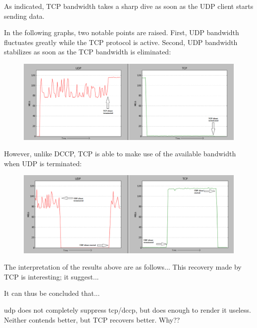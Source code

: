 \documentclass[10pt,a4paper]{article}
\begin{document}
As indicated, TCP bandwidth takes a sharp dive as soon as
the UDP client starts sending data. 

In the following graphs, two notable points are raised. First,
UDP bandwidth fluctuates greatly while the TCP protocol is active.
Second, UDP bandwidth stabilizes as soon as the TCP bandwidth
is eliminated:

\begin{figure}[!h]
\begin{center}
\includegraphics[scale=.4]{screens/re/Screenshot-7.png}
\end{center}
\end{figure}

However, unlike DCCP, TCP is able to make use of the available
bandwidth when UDP is terminated:

\begin{figure}[!h]
\begin{center}
\includegraphics[scale=.4]{screens/re/Screenshot-15.png}
\end{center}
\end{figure}

The interpretation of the results above are as follows...
This recovery made by TCP is interesting; it suggest... %

It can thus be concluded that...

udp does not completely suppress tcp/dccp, but does 
enough to render it useless.
Neither contends better, but TCP recovers better. Why??
\end{document}
